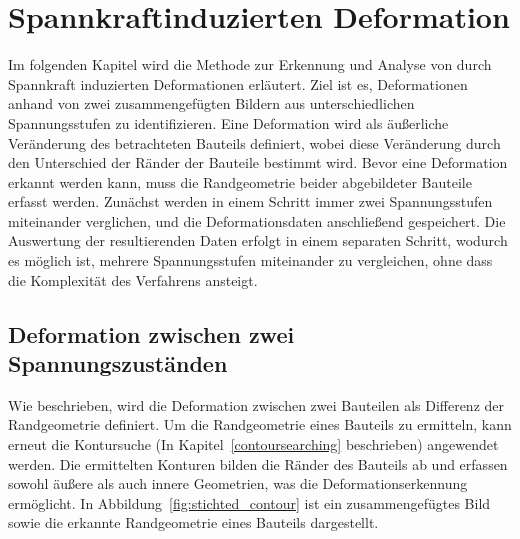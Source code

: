 
\chapter{Spannkraftinduzierten Deformation}

Im folgenden Kapitel wird die Methode zur Erkennung und Analyse von durch 
Spannkraft induzierten Deformationen erläutert. Ziel ist es, 
Deformationen anhand von zwei zusammengefügten Bildern aus unterschiedlichen 
Spannungsstufen zu identifizieren. Eine Deformation wird als äußerliche 
Veränderung des betrachteten Bauteils definiert, wobei diese Veränderung 
durch den Unterschied der Ränder der Bauteile bestimmt wird.
Bevor eine Deformation erkannt werden kann, muss die Randgeometrie beider 
abgebildeter Bauteile erfasst werden. 
Zunächst werden in einem Schritt immer zwei Spannungsstufen miteinander verglichen,
und die Deformationsdaten anschließend gespeichert. 
Die Auswertung der resultierenden Daten erfolgt in einem separaten Schritt, 
wodurch es möglich ist, mehrere Spannungsstufen miteinander zu vergleichen,
ohne dass die Komplexität des Verfahrens ansteigt.

\section{Deformation zwischen zwei Spannungszuständen}

Wie beschrieben, wird die Deformation zwischen zwei Bauteilen als Differenz 
der Randgeometrie definiert. Um die Randgeometrie eines Bauteils zu ermitteln, 
kann erneut die Kontursuche (In Kapitel~\ref{contoursearching} beschrieben)
angewendet werden. 
Die ermittelten Konturen bilden die Ränder des Bauteils ab und 
erfassen sowohl äußere als auch innere Geometrien, was 
die Deformationserkennung ermöglicht. In Abbildung~\ref{fig:stichted_contour} 
ist ein zusammengefügtes Bild sowie die erkannte Randgeometrie eines 
Bauteils dargestellt.


